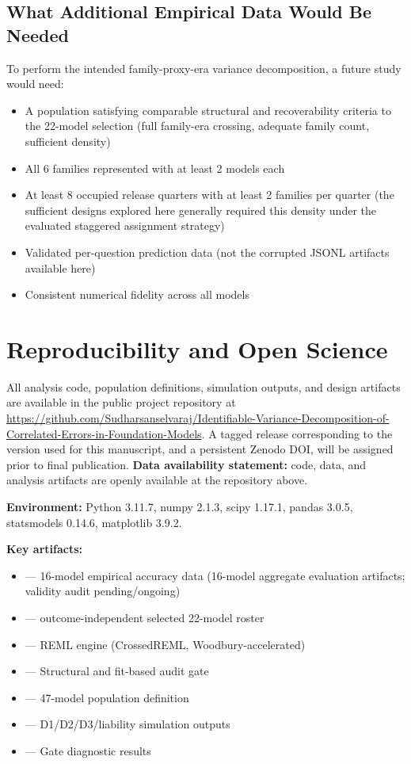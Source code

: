 \documentclass{ieeeaccess}
\theoremstyle{definition}
\theoremstyle{plain}
\begin{document}
\subsection{What Additional Empirical Data Would Be Needed}
To perform the intended family-proxy-era variance decomposition, a future study would need:
\begin{itemize}
\item A population satisfying comparable structural and recoverability criteria to the 22-model selection (full family-era crossing, adequate family count, sufficient density)
\item All 6 families represented with at least 2 models each
\item At least 8 occupied release quarters with at least 2 families per quarter (the sufficient designs explored here generally required this density under the evaluated staggered assignment strategy)
\item Validated per-question prediction data (not the corrupted JSONL artifacts available here)
\item Consistent numerical fidelity across all models
\end{itemize}

\section{Reproducibility and Open Science}
\label{sec:repro}

All analysis code, population definitions, simulation outputs, and design artifacts are available in the public project repository at \url{https://github.com/Sudharsanselvaraj/Identifiable-Variance-Decomposition-of-Correlated-Errors-in-Foundation-Models}. A tagged release corresponding to the version used for this manuscript, and a persistent Zenodo DOI, will be assigned prior to final publication. \textbf{Data availability statement:} code, data, and analysis artifacts are openly available at the repository above.

\textbf{Environment:} Python 3.11.7, numpy 2.1.3, scipy 1.17.1, pandas 3.0.5, statsmodels 0.14.6, matplotlib 3.9.2.

\textbf{Key artifacts:}
\begin{itemize}
\item {} --- 16-model empirical accuracy data (16-model aggregate evaluation artifacts; validity audit pending/ongoing)
\item {} --- outcome-independent selected 22-model roster
\item {} --- REML engine (CrossedREML, Woodbury-accelerated)
\item {} --- Structural and fit-based audit gate
\item {} --- 47-model population definition
\item {} --- D1/D2/D3/liability simulation outputs
\item {} --- Gate diagnostic results
\end{itemize}
\end{document}
